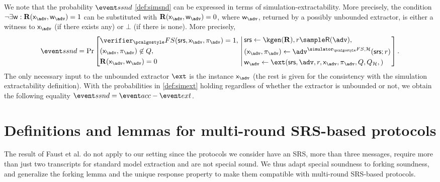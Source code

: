 \documentclass[runningheads,11pt]{llncs}
\begin{document}
  \label{rem:simext_to_simsnd}
  We note that the probability $\ssndProb$ \cref{def:simsnd} can be expressed in
  terms of simulation-extractability. More precisely, the
  condition $\neg \exists \wit: \REL(\inp_\adv, \wit_\adv) = 1$ can be substituted with
  $\REL(\inp_\adv, \wit_\adv) = 0$, where $\wit_\adv$, returned by a possibly unbounded
  extractor, is either a witness to $\inp_\adv$ (if there exists any) or $\bot$ (if
  there is none). More precisely,
\[
      \ssndProb =
      \Pr\left[
        \begin{aligned}
          & \verifier_\fs(\srs, \inp_{\adv}, \zkproof_{\adv}) = 1,\\
          & (\inp_{\advse}, \zkproof_{\advse}) \not\in Q,\\
          & \REL(\inp_{\adv}, \wit_{\adv}) = 0
        \end{aligned}
        \, \left| \,
      \begin{aligned}
        & \srs \gets \kgen(\REL), r \sample \RND{\advse},\\
        & (\inp_{\advse}, \zkproof_{\advse}) \gets \advse^{\simulator_\fs,
          \ro} (\srs; r)\\
        & \wit_{\adv} \gets \ext(\srs, \advse, r, \inp_{\advse}, \zkproof_{\advse},
			Q, Q_\ro,) 
      \end{aligned}
		\right.  \right].
\]
The only necessary input to the unbounded extractor $\ext$ is the instance
$\inp_\adv$ (the rest is given for the consistency with the simulation extractability
definition). 
%
With the probabilities in \cref{def:simext} holding regardless of whether the extractor
is unbounded or not, we obtain the following equality
$ \ssndProb = \accProb - \extProb$.


\fi
\section{Definitions and lemmas for multi-round SRS-based protocols}
\label{sec:se_definitions}


The result of Faust et al.\cite{INDOCRYPT:FKMV12} do not apply to our setting
since the protocols we consider have an SRS, more than three messages, require more than
just two transcripts for standard model extraction and are not special
sound. We thus adapt special
soundness to forking soundness, and generalize the forking lemma and the unique response property to make them compatible with
multi-round SRS-based protocols.
\end{document}
